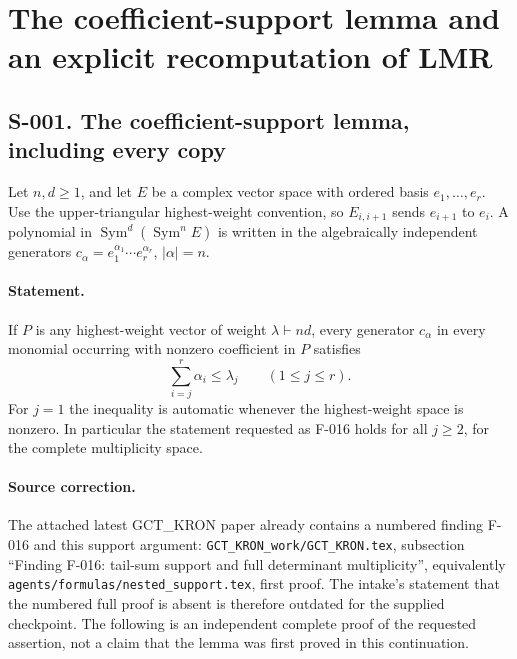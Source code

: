 \section{The coefficient-support lemma and an explicit recomputation of LMR}
\subsection{S-001. The coefficient-support lemma, including every copy}
Let $n,d\geq1$, and let $E$ be a complex vector space with ordered basis $e_1,\ldots,e_r$.
Use the upper-triangular highest-weight convention, so $E_{i,i+1}$
sends $e_{i+1}$ to $e_i$.  A polynomial in
$\operatorname{Sym}^d(\operatorname{Sym}^n E)$ is written in the algebraically
independent generators $c_\alpha=e_1^{\alpha_1}\cdots e_r^{\alpha_r}$,
$|\alpha|=n$.

\paragraph{Statement.}
If $P$ is any highest-weight vector of weight $\lambda\vdash nd$, every
generator $c_\alpha$ in every monomial occurring with nonzero coefficient
in $P$ satisfies
\[
             \sum_{i=j}^r\alpha_i\leq\lambda_j
                   \qquad(1\leq j\leq r).
\]
For $j=1$ the inequality is automatic whenever the highest-weight space
is nonzero. In particular the statement requested as F-016 holds for
all $j\geq2$, for the complete multiplicity space.

\paragraph{Source correction.}
The attached latest GCT\_KRON paper already contains a numbered finding
F-016 and this support argument: \texttt{GCT\_KRON\_work/GCT\_KRON.tex},
subsection ``Finding F-016: tail-sum support and full determinant
multiplicity'', equivalently
\texttt{agents/formulas/nested\_support.tex}, first proof.
The intake's statement that the numbered full proof is absent is therefore
outdated for the supplied checkpoint. The following is an independent
complete proof of the requested assertion, not a claim that the lemma was
first proved in this continuation.

